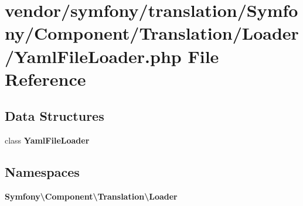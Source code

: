 \section{vendor/symfony/translation/\+Symfony/\+Component/\+Translation/\+Loader/\+Yaml\+File\+Loader.php File Reference}
\label{translation_2_symfony_2_component_2_translation_2_loader_2_yaml_file_loader_8php}
\subsection*{Data Structures}
\begin{DoxyCompactItemize}
\item 
class {\bf Yaml\+File\+Loader}
\end{DoxyCompactItemize}
\subsection*{Namespaces}
\begin{DoxyCompactItemize}
\item 
 {\bf Symfony\textbackslash{}\+Component\textbackslash{}\+Translation\textbackslash{}\+Loader}
\end{DoxyCompactItemize}
